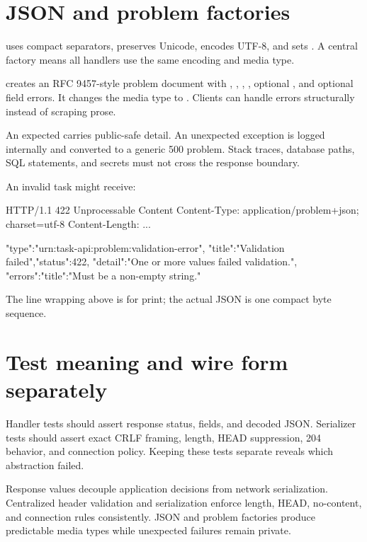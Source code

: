 \section{JSON and problem factories}

 uses compact separators, preserves Unicode, encodes
UTF-8, and sets . A central factory means
all handlers use the same encoding and media type.

 creates an RFC 9457-style problem document with
, , , , optional
, and optional field errors. It changes the media type to
. Clients can handle errors structurally instead
of scraping prose.

An expected  carries public-safe detail. An unexpected exception
is logged internally and converted to a generic 500 problem. Stack traces,
database paths, SQL statements, and secrets must not cross the response boundary.

\begin{wireview}
An invalid task might receive:
\begin{wiremessage}
HTTP/1.1 422 Unprocessable Content
Content-Type: application/problem+json; charset=utf-8
Content-Length: ...

{"type":"urn:task-api:problem:validation-error",
 "title":"Validation failed","status":422,
 "detail":"One or more values failed validation.",
 "errors":{"title":"Must be a non-empty string."}}
\end{wiremessage}
The line wrapping above is for print; the actual JSON is one compact byte sequence.
\end{wireview}

\section{Test meaning and wire form separately}

Handler tests should assert response status, fields, and decoded JSON. Serializer
tests should assert exact CRLF framing, length, HEAD suppression, 204 behavior,
and connection policy. Keeping these tests separate reveals which abstraction
failed.

\summarytitle

Response values decouple application decisions from network serialization.
Centralized header validation and serialization enforce length, HEAD, no-content,
and connection rules consistently. JSON and problem factories produce predictable
media types while unexpected failures remain private.

